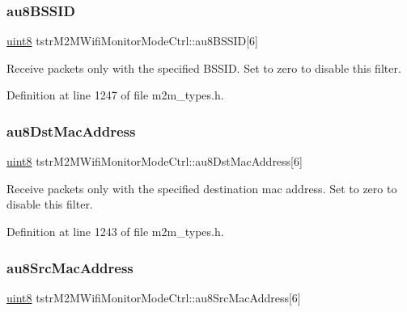 \subsubsection{\texorpdfstring{au8\+B\+S\+S\+ID}{au8BSSID}}
{\footnotesize\ttfamily \hyperlink{group__DataT_ga4df709a77647e870bbf1d955b8edc9a6}{uint8} tstr\+M2\+M\+Wifi\+Monitor\+Mode\+Ctrl\+::au8\+B\+S\+S\+ID\mbox{[}6\mbox{]}}

Receive packets only with the specified B\+S\+S\+ID. Set to zero to disable this filter. 

Definition at line 1247 of file m2m\+\_\+types.\+h.

\mbox{\label{structtstrM2MWifiMonitorModeCtrl_a17dc78f74326e73f049a9e0f46f8a0bc}} 
\subsubsection{\texorpdfstring{au8\+Dst\+Mac\+Address}{au8DstMacAddress}}
{\footnotesize\ttfamily \hyperlink{group__DataT_ga4df709a77647e870bbf1d955b8edc9a6}{uint8} tstr\+M2\+M\+Wifi\+Monitor\+Mode\+Ctrl\+::au8\+Dst\+Mac\+Address\mbox{[}6\mbox{]}}

Receive packets only with the specified destination mac address. Set to zero to disable this filter. 

Definition at line 1243 of file m2m\+\_\+types.\+h.

\mbox{\label{structtstrM2MWifiMonitorModeCtrl_a847ad12cf394e15bb7f4aecea0eb8222}} 
\subsubsection{\texorpdfstring{au8\+Src\+Mac\+Address}{au8SrcMacAddress}}
{\footnotesize\ttfamily \hyperlink{group__DataT_ga4df709a77647e870bbf1d955b8edc9a6}{uint8} tstr\+M2\+M\+Wifi\+Monitor\+Mode\+Ctrl\+::au8\+Src\+Mac\+Address\mbox{[}6\mbox{]}}

